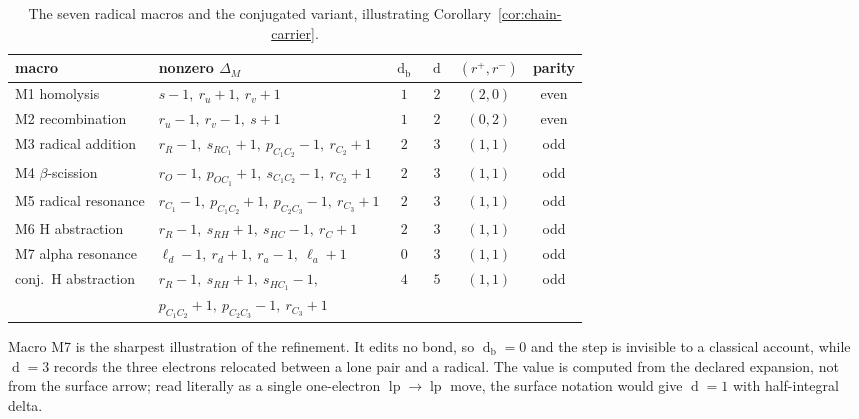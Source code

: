 \documentclass[11pt]{article}
\numberwithin{equation}{section}
\newcommand{\lp}{\operatorname{lp}}
\newcommand{\del}{\operatorname{d}}
\theoremstyle{plain}
\theoremstyle{definition}
\theoremstyle{remark}
\begin{document}
\begin{table}[htbp]
\centering
\footnotesize
\setlength{\tabcolsep}{4pt}
\caption{The seven radical macros and the conjugated variant, illustrating
Corollary~\ref{cor:chain-carrier}.}
\label{tab:macros}
\begin{tabular}{@{}l l c c c c@{}}
\toprule
macro & nonzero $\Delta_M$ & $\del_{\mathrm b}$ & $\del$ & $(r^+,r^-)$ & parity \\
\midrule
M1 homolysis
  & $s{-}1,\ r_u{+}1,\ r_v{+}1$ & $1$ & $2$ & $(2,0)$ & even \\
M2 recombination
  & $r_u{-}1,\ r_v{-}1,\ s{+}1$ & $1$ & $2$ & $(0,2)$ & even \\
M3 radical addition
  & $r_R{-}1,\ s_{RC_1}{+}1,\ p_{C_1C_2}{-}1,\ r_{C_2}{+}1$ & $2$ & $3$ & $(1,1)$ & odd \\
M4 $\beta$-scission
  & $r_O{-}1,\ p_{OC_1}{+}1,\ s_{C_1C_2}{-}1,\ r_{C_2}{+}1$ & $2$ & $3$ & $(1,1)$ & odd \\
M5 radical resonance
  & $r_{C_1}{-}1,\ p_{C_1C_2}{+}1,\ p_{C_2C_3}{-}1,\ r_{C_3}{+}1$ & $2$ & $3$ & $(1,1)$ & odd \\
M6 H abstraction
  & $r_R{-}1,\ s_{RH}{+}1,\ s_{HC}{-}1,\ r_C{+}1$ & $2$ & $3$ & $(1,1)$ & odd \\
M7 alpha resonance
  & $\ell_d{-}1,\ r_d{+}1,\ r_a{-}1,\ \ell_a{+}1$ & $0$ & $3$ & $(1,1)$ & odd \\
\addlinespace[2pt]
conj.\ H abstraction
  & $r_R{-}1,\ s_{RH}{+}1,\ s_{HC_1}{-}1,$ & $4$ & $5$ & $(1,1)$ & odd \\
  & $p_{C_1C_2}{+}1,\ p_{C_2C_3}{-}1,\ r_{C_3}{+}1$ & & & & \\
\bottomrule
\end{tabular}
\end{table}

Macro M7 is the sharpest illustration of the refinement.  It edits no bond, so
$\del_{\mathrm b}=0$ and the step is invisible to a classical account, while
$\del=3$ records the three electrons relocated between a lone pair and a
radical.  The value is computed from the declared expansion, not from the
surface arrow; read literally as a single one-electron $\lp\to\lp$ move, the
surface notation would give $\del=1$ with half-integral delta.
\end{document}
